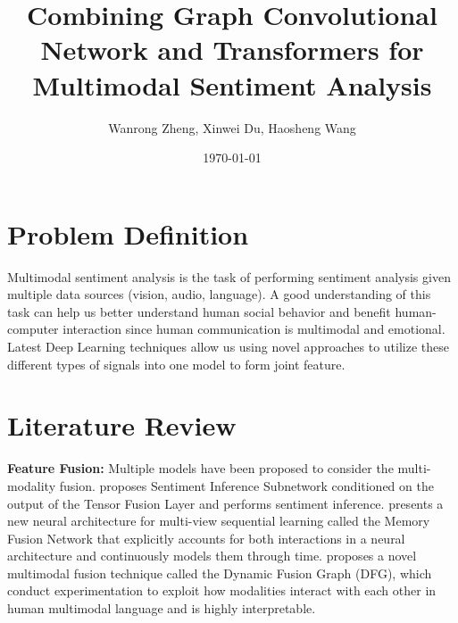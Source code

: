 \documentclass[11pt]{article}
\title{Combining Graph Convolutional Network and Transformers for Multimodal Sentiment Analysis}
\author{
  Wanrong Zheng,
  Xinwei Du,
  Haosheng Wang
  }
\date{\today}
\begin{document}
\maketitle

\section{Problem Definition}
Multimodal sentiment analysis is the task of performing sentiment analysis given multiple data sources (vision, audio, language).
A good understanding of this task can help us better understand human social behavior and benefit human-computer interaction since human communication is multimodal and emotional.
Latest Deep Learning techniques allow us using novel approaches to utilize these different types of signals into one model to form joint feature.  


\section{Literature Review}
\noindent \textbf{Feature Fusion:}
Multiple models have been proposed to consider the multi-modality fusion. \cite{DBLP:journals/corr/VaswaniSPUJGKP17} proposes Sentiment Inference Subnetwork conditioned on the output of the Tensor
Fusion Layer and performs sentiment inference. 
\cite{DBLP:journals/corr/abs-1802-00927} presents a new neural architecture for multi-view sequential learning called the Memory Fusion Network that explicitly accounts for both interactions in a neural architecture and continuously models them through time.
\cite{bagher-zadeh-etal-2018-multimodal} proposes a novel multimodal fusion technique called the Dynamic Fusion Graph (DFG), which conduct experimentation to exploit how modalities interact with each other in human multimodal language and is highly interpretable.
\end{document}
